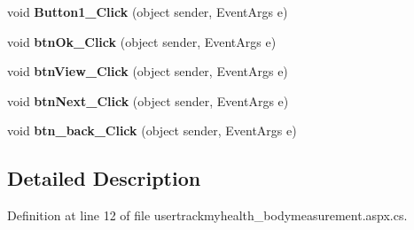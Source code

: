 \begin{DoxyCompactItemize}
\item 
\hypertarget{classusertrackmyhealth__bodymeasurement_a1ce85222922590c4ff246745e1338a98}{void {\bfseries Button1\-\_\-\-Click} (object sender, Event\-Args e)}\label{classusertrackmyhealth__bodymeasurement_a1ce85222922590c4ff246745e1338a98}

\item 
\hypertarget{classusertrackmyhealth__bodymeasurement_afea29cbb91d8dabcab9e58775f0680ce}{void {\bfseries btn\-Ok\-\_\-\-Click} (object sender, Event\-Args e)}\label{classusertrackmyhealth__bodymeasurement_afea29cbb91d8dabcab9e58775f0680ce}

\item 
\hypertarget{classusertrackmyhealth__bodymeasurement_ae47ccc516acfc1d3235d82a599f9fb13}{void {\bfseries btn\-View\-\_\-\-Click} (object sender, Event\-Args e)}\label{classusertrackmyhealth__bodymeasurement_ae47ccc516acfc1d3235d82a599f9fb13}

\item 
\hypertarget{classusertrackmyhealth__bodymeasurement_abae31dc0fccc121c6765a7623c3b5ba5}{void {\bfseries btn\-Next\-\_\-\-Click} (object sender, Event\-Args e)}\label{classusertrackmyhealth__bodymeasurement_abae31dc0fccc121c6765a7623c3b5ba5}

\item 
\hypertarget{classusertrackmyhealth__bodymeasurement_ac78e7bf083ecd024cb4be2535fa5be32}{void {\bfseries btn\-\_\-back\-\_\-\-Click} (object sender, Event\-Args e)}\label{classusertrackmyhealth__bodymeasurement_ac78e7bf083ecd024cb4be2535fa5be32}

\end{DoxyCompactItemize}


\subsection{Detailed Description}


Definition at line 12 of file usertrackmyhealth\-\_\-bodymeasurement.\-aspx.\-cs.



